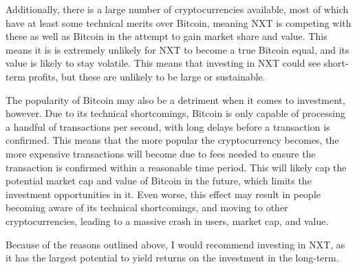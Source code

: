 \documentclass[11pt,a4paper]{article}
\begin{document}
	Additionally, there is a large number of cryptocurrencies available, most of which have at least some technical merits over Bitcoin, meaning NXT is competing with these as well as Bitcoin in the attempt to gain market share and value. This means it is is extremely unlikely for NXT to become a true Bitcoin equal, and its value is likely to stay volatile. This means that investing in NXT could see short-term profits, but these are unlikely to be large or sustainable.
	
	The popularity of Bitcoin may also be a detriment when it comes to investment, however. Due to its technical shortcomings, Bitcoin is only capable of processing a handful of transactions per second, with long delays before a transaction is confirmed. This means that the more popular the cryptocurrency becomes, the more expensive transactions will become due to fees needed to ensure the transaction is confirmed within a reasonable time period. This will likely cap the potential market cap and value of Bitcoin in the future, which limits the investment opportunities in it. Even worse, this effect may result in people becoming aware of its technical shortcomings, and moving to other cryptocurrencies, leading to a massive crash in users, market cap, and value.
	
	Because of the reasons outlined above, I would recommend investing in NXT, as it has the largest potential to yield returns on the investment in the long-term.
\end{document}
